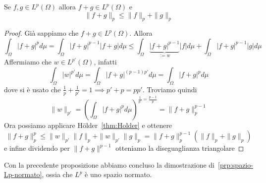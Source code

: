 \begin{proposition}\label{prop:minkowski}
    Se \(f, g \in L^{p}{(\Omega)}\) allora \(f + g \in L^{p}{(\Omega)}\) e
    \[
        \|f+g\|_p \le \|f\|_p + \|g\|_p
    \]
\end{proposition}
\begin{proof}
    Già sappiamo che \(f+g \in L^{p}{(\Omega)}\). Allora
    \begin{equation*}
        \int_\Omega |f+g|^{p} d\mu = \int_\Omega |f+g|^{p-1} |f+g| d\mu \le
        \int_\Omega \underbrace{|f+g|^{p-1}}_{:= w} |f| d\mu + \int_\Omega |f+g|^{p-1} |g| d\mu
    \end{equation*}
    Affermiamo che \(w \in L^{p'}{(\Omega)}\), infatti
    \[
        \int_\Omega |w|^{p'} d\mu = \int_\Omega |f+g|^{(p-1)p'} d\mu = \int_\Omega |f+g|^{p} d\mu
    \]
    dove si è usato che \(\frac{1}{p} + \frac{1}{p'} = 1 \implies p' + p =
    pp'\). Troviamo quindi
    \[
        \|w\|_{p'} = {\left( \int_\Omega |f+g|^{p}d\mu \right)}^{\frac{1}{p'} =
        \frac{p-1}{p}} = \|f + g\|_p^{p-1}
    \]
    Ora possiamo applicare Hölder~\ref{thm:Holder} e ottenere
    \[
        \|f+g\|_p^{p} \le \|w\|_{p'} \|f\|_p + \|w\|_{p'} \|g\|_p =
        \|f+g\|_p^{p-1}{\left( \|f\|_p + \|g\|_p \right)} 
    \]
    e infine dividendo per \(\|f+g\|^{p-1}\) otteniamo la diseguaglianza
    triangolare
\end{proof}
Con la precedente proposizione abbiamo concluso la dimostrazione
di~\ref{prp:spazio-Lp-normato}, ossia che \(L^{p}\) è uno spazio
normato.

